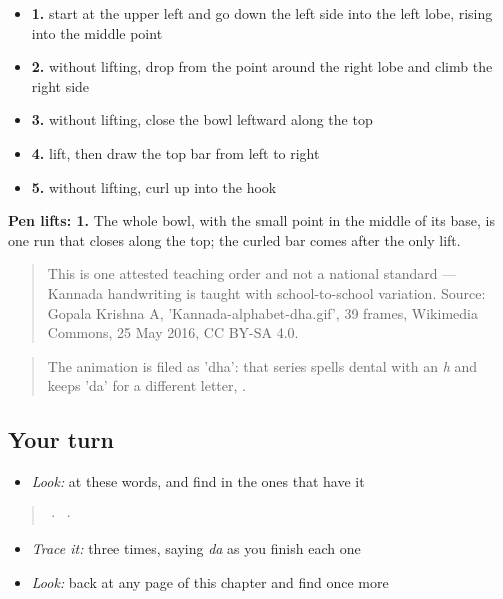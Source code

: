 \begin{itemize}
\raggedright
  \item \textbf{1.} start at the upper left and go down the left side into the left lobe, rising into the middle point
  \item \textbf{2.} without lifting, drop from the point around the right lobe and climb the right side
  \item \textbf{3.} without lifting, close the bowl leftward along the top
  \item \textbf{4.} lift, then draw the top bar from left to right
  \item \textbf{5.} without lifting, curl up into the hook
\end{itemize}

\textbf{Pen lifts: 1.} The whole bowl, with the small point in the middle of its base, is one run that closes along the top; the curled bar comes after the only lift.

\begin{quote}
This is one attested teaching order and not a national standard — Kannada handwriting is taught with school-to-school variation. Source: Gopala Krishna A, 'Kannada-alphabet-dha.gif', 39 frames, Wikimedia Commons, 25 May 2016, CC BY-SA 4.0.
\end{quote}

\begin{quote}
The animation is filed as 'dha': that series spells dental  with an \emph{h} and keeps 'da' for a different letter, .
\end{quote}

\subsection*{Your turn}
\begin{itemize}
\raggedright
  \item \emph{Look:} at these words, and find  in the ones that have it
\end{itemize}

\begin{quote}
  ·    ·  
\end{quote}

\begin{itemize}
\raggedright
  \item \emph{Trace it:}  three times, saying \emph{da} as you finish each one
  \item \emph{Look:} back at any page of this chapter and find  once more
\end{itemize}

